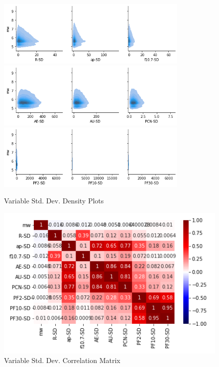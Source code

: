 \documentclass[12pt]{article}
\begin{document}
\begin{figure}
\centering
   \includegraphics[width=0.82\textwidth]{sd_kdeplot_1.png}
   \includegraphics[width=0.82\textwidth]{sd_kdeplot_2.png}
   \includegraphics[width=0.82\textwidth]{sd_kdeplot_3.png}
   \caption{Variable Std. Dev. Density Plots}

   \includegraphics{sd_heatmap.png}
   \caption{Variable Std. Dev. Correlation Matrix}
\end{figure}
\end{document}
